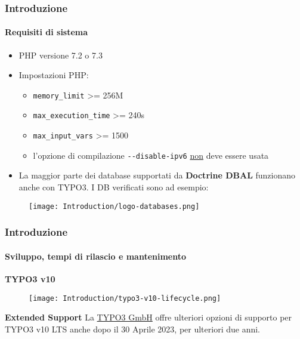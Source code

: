 
\begin{frame}[fragile]
	\frametitle{Introduzione}
	\framesubtitle{Requisiti di sistema}

	\begin{itemize}
		\item PHP versione 7.2 o 7.3
		\item Impostazioni PHP:

			\begin{itemize}
				\item \texttt{memory\_limit} >= 256M
				\item \texttt{max\_execution\_time} >= 240s
				\item \texttt{max\_input\_vars} >= 1500
				\item l'opzione di compilazione \texttt{-}\texttt{-disable-ipv6} \underline{non} deve essere usata
			\end{itemize}

		\item La maggior parte dei database supportati da \textbf{Doctrine DBAL} funzionano anche con TYPO3.
			I DB verificati sono ad esempio:
	\end{itemize}

	\begin{figure}
		\texttt{[image: Introduction/logo-databases.png]}
	\end{figure}

\end{frame}


\begin{frame}[fragile]
	\frametitle{Introduzione}
	\framesubtitle{Sviluppo, tempi di rilascio e mantenimento}

	\textbf{TYPO3 v10}

	\begin{figure}
		\texttt{[image: Introduction/typo3-v10-lifecycle.png]}
	\end{figure}

	\textbf{Extended Support}\newline
	\smaller
		La \href{https://typo3.com}{TYPO3 GmbH} offre ulteriori opzioni di supporto
		per TYPO3 v10 LTS anche dopo il 30 Aprile 2023, per ulteriori due anni.
	\normalsize

\end{frame}


